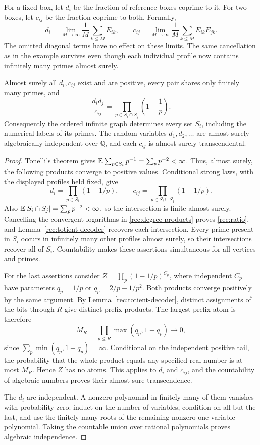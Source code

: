 For a fixed box, let $d_i$ be the fraction of reference boxes coprime to
it. For two boxes, let $c_{ij}$ be the fraction coprime to both. Formally,
\[
 d_i=\lim_{M\to\infty}\frac1M\sum_{k\le M}E_{ik},\qquad
 c_{ij}=\lim_{M\to\infty}\frac1M\sum_{k\le M}E_{ik}E_{jk}.
\]
The omitted diagonal terms have no effect on these limits. The same
cancellation as in the example survives even though each individual
profile now contains infinitely many primes almost surely.

\begin{theorem}\label{rec:frequency}
Almost surely all $d_i,c_{ij}$ exist and are positive, every pair shares
only finitely many primes, and
\begin{equation}\label{rec:ratio}
 \frac{d_i d_j}{c_{ij}}
 =\prod_{p\in S_i\cap S_j}\left(1-\frac1p\right).
\end{equation}
Consequently the ordered infinite graph determines every set $S_i$,
including the numerical labels of its primes. The random variables
$d_1,d_2,\ldots$ are almost surely algebraically independent over
$\mathbb Q$, and each $c_{ij}$ is almost surely transcendental.
\end{theorem}
\begin{proof}
Tonelli's theorem gives
$\mathbb E\sum_{p\in S_i}p^{-1}=\sum_p p^{-2}<\infty$. Thus, almost surely,
the following products converge to positive values. Conditional strong
laws, with the displayed profiles held fixed, give
\begin{equation}\label{rec:degree-products}
 d_i=\prod_{p\in S_i}(1-1/p),\qquad
 c_{ij}=\prod_{p\in S_i\cup S_j}(1-1/p).
\end{equation}
Also $\mathbb E|S_i\cap S_j|=\sum_p p^{-2}<\infty$, so the intersection is
finite almost surely. Cancelling the convergent logarithms in
\eqref{rec:degree-products} proves \eqref{rec:ratio}, and
Lemma~\ref{rec:totient-decoder} recovers each intersection. Every prime
present in $S_i$ occurs in infinitely many other profiles almost surely,
so their intersections recover all of $S_i$. Countability makes these
assertions simultaneous for all vertices and primes.

For the last assertions consider
$Z=\prod_p(1-1/p)^{C_p}$, where independent $C_p$ have parameters
$q_p=1/p$ or $q_p=2/p-1/p^2$. Both products converge positively by the
same argument. By Lemma~\ref{rec:totient-decoder}, distinct assignments
of the bits through $R$ give distinct prefix products. The largest
prefix atom is therefore
\[
 M_R=\prod_{p\le R}\max(q_p,1-q_p)\longrightarrow0,
\]
since $\sum_p\min(q_p,1-q_p)=\infty$. Conditional on the independent
positive tail, the probability that the whole product equals any
specified real number is at most $M_R$. Hence $Z$ has no atoms. This
applies to $d_i$ and $c_{ij}$, and the countability of algebraic numbers
proves their almost-sure transcendence.

The $d_i$ are independent. A nonzero polynomial in finitely many of
them vanishes with probability zero: induct on the number of variables,
condition on all but the last, and use the finitely many roots of the
remaining nonzero one-variable polynomial. Taking the countable union
over rational polynomials proves algebraic independence.
\end{proof}

